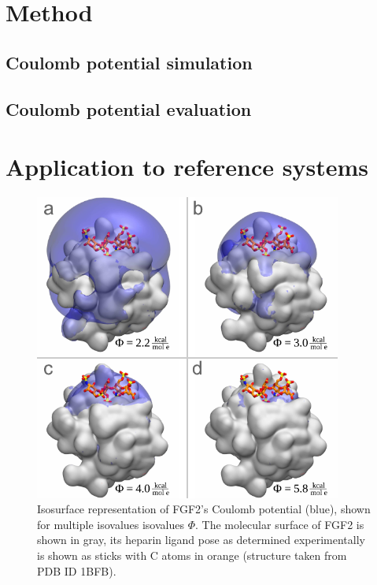 %


\section{Method}

\subsection{Coulomb potential simulation}

\subsection{Coulomb potential evaluation}

\section{Application to reference systems}


\begin{figure}
\centering
\includegraphics[width=0.9\textwidth]{gfx/bspred/fgf2_coulomb_isosurfaces_different_values_03_ds.pdf}
\caption[]{
Isosurface representation of FGF2's Coulomb potential (blue), shown for multiple
isovalues isovalues $\Phi$. The molecular surface of FGF2 is shown in gray, its
heparin ligand pose as determined experimentally is shown as sticks with C atoms
in orange (structure taken from PDB ID 1BFB). }
\label{fig:bspred:fgf2_multi_iso}
\end{figure}



